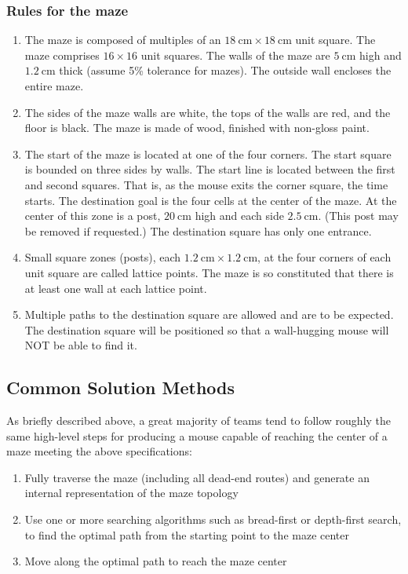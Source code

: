 \documentclass[10pt,twocolumn,letterpaper]{article}
\begin{document}
\subsubsection{Rules for the maze}
\label{ssub:mazerules}
\begin{enumerate}
	\item The maze is composed of multiples of an $18\ \textrm{cm} \times 18\ \textrm{cm}$ unit square. The maze
       comprises $16 \times 16$ unit squares. The walls of the maze are $5\ \textrm{cm}$ high and $1.2\ \textrm{cm}$
       thick (assume 5\% tolerance for mazes). The outside wall encloses the entire maze.
	\item The sides of the maze walls are white, the tops of the walls are red, and the floor is black. The maze is made
       of wood, finished with non-gloss paint.
	\item The start of the maze is located at one of the four corners. The start square is bounded on three sides by
       walls. The start line is located between the first and second squares. That is, as the mouse exits the corner
       square, the time starts. The destination goal is the four cells at the center of the maze. At the center of this
       zone is a post, $20\ \textrm{cm}$ high and each side $2.5\ \textrm{cm}$. (This post may be removed if requested.)
       The destination square has only one entrance.
	\item Small square zones (posts), each $1.2\ \textrm{cm} \times 1.2\ \textrm{cm}$, at the four corners of each unit
       square are called lattice points. The maze is so constituted that there is at least one wall at each lattice
       point.
	\item Multiple paths to the destination square are allowed and are to be expected. The destination square will be
       positioned so that a wall-hugging mouse will NOT be able to find it.
\end{enumerate}

\subsection{Common Solution Methods}
\label{sub:solutionmethods}
As briefly described above, a great majority of teams tend to follow roughly the same high-level steps for producing a
mouse capable of reaching the center of a maze meeting the above specifications:

\begin{enumerate}
	\item Fully traverse the maze (including all dead-end routes) and generate an internal representation of the maze
	topology
	\item Use one or more searching algorithms such as bread-first or depth-first search, to find the optimal path from
	the starting point to the maze center
	\item Move along the optimal path to reach the maze center
\end{enumerate}
\end{document}
